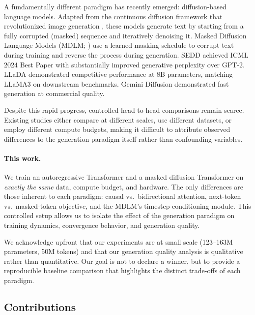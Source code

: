 \documentclass[11pt,a4paper]{article}
\begin{document}
A fundamentally different paradigm has recently emerged: diffusion-based language models.
Adapted from the continuous diffusion framework that revolutionized image generation \citep{ho2020ddpm,song2021score}, these models generate text by starting from a fully corrupted (masked) sequence and iteratively denoising it.
Masked Diffusion Language Models (MDLM; \citealt{mdlm}) use a learned masking schedule to corrupt text during training and reverse the process during generation.
SEDD \citep{sedd} achieved ICML 2024 Best Paper with substantially improved generative perplexity over GPT-2.
LLaDA \citep{llada} demonstrated competitive performance at 8B parameters, matching LLaMA3 on downstream benchmarks.
Gemini Diffusion \citep{geminidiffusion} demonstrated fast generation at commercial quality.

Despite this rapid progress, controlled head-to-head comparisons remain scarce.
Existing studies either compare at different scales, use different datasets, or employ different compute budgets, making it difficult to attribute observed differences to the generation paradigm itself rather than confounding variables.

\paragraph{This work.}
We train an autoregressive Transformer and a masked diffusion Transformer on \emph{exactly the same} data, compute budget, and hardware.
The only differences are those inherent to each paradigm: causal vs.\ bidirectional attention, next-token vs.\ masked-token objective, and the MDLM's timestep conditioning module.
This controlled setup allows us to isolate the effect of the generation paradigm on training dynamics, convergence behavior, and generation quality.

We acknowledge upfront that our experiments are at small scale (123--163M parameters, 50M tokens) and that our generation quality analysis is qualitative rather than quantitative.
Our goal is not to declare a winner, but to provide a reproducible baseline comparison that highlights the distinct trade-offs of each paradigm.

\subsection{Contributions}
\end{document}
